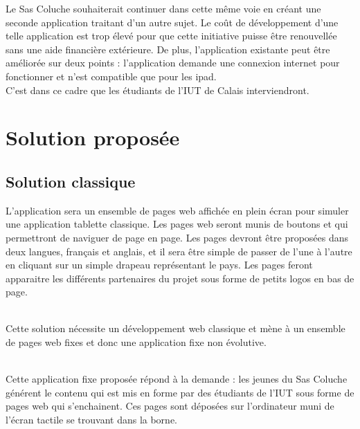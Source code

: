 \documentclass[11pt]{article}
\begin{document}
Le Sas Coluche souhaiterait continuer dans cette même voie en créant une seconde application traitant d'un autre sujet. Le coût de développement d'une telle application est trop élevé pour que cette initiative puisse être renouvellée sans une aide financière extérieure. De plus, l'application existante peut être améliorée sur deux points : l'application demande une connexion internet pour fonctionner et n'est compatible que pour les ipad.\\

C'est dans ce cadre que les étudiants de l'IUT de Calais interviendront.

\section{Solution proposée}
\subsection{Solution classique}
L'application sera un ensemble de pages web affichée en plein écran pour simuler une application tablette classique. Les pages web seront munis de boutons  et \verb@suivant@ qui permettront de naviguer de page en page. Les pages devront être proposées dans deux langues, français et anglais, et il sera être simple de passer de l'une à l'autre en cliquant sur un simple drapeau représentant le pays. Les pages feront apparaitre les différents partenaires du projet sous forme de petits logos en bas de page.\\~

Cette solution nécessite un développement web classique et mène à un ensemble de pages web fixes et donc une application fixe non évolutive.\\~

Cette application fixe proposée répond à la demande : les jeunes du Sas Coluche générent le contenu qui est mis en forme par des étudiants de l'IUT sous forme de pages web qui s'enchainent. Ces pages sont déposées sur l'ordinateur muni de l'écran tactile se trouvant dans la borne.
\end{document}
